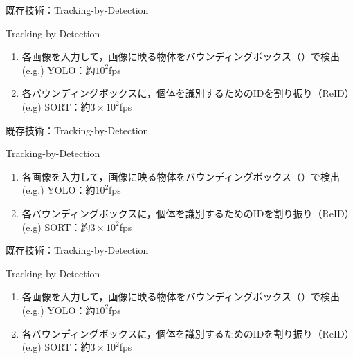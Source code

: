 \begin{frame}{既存技術：Tracking-by-Detection}
    \begin{block}{Tracking-by-Detection}
        \begin{enumerate}
            \item 各画像を入力して，画像に映る物体をバウンディングボックス（\red{$\square$}）で検出
            \\\ra (e.g.) YOLO：約$10^2$fps
            \item 各バウンディングボックスに，個体を識別するためのIDを割り振り（ReID）
            \\\ra (e.g) SORT：約$3\times10^2$fps
        \end{enumerate}        
    \end{block}
\end{frame}
\begin{frame}[noframenumbering]{既存技術：Tracking-by-Detection}
    \begin{block}{Tracking-by-Detection}
        \begin{enumerate}
            \item 各画像を入力して，画像に映る物体をバウンディングボックス（\red{$\square$}）で検出
            \\\ra (e.g.) YOLO：約$10^2$fps
            \item 各バウンディングボックスに，個体を識別するためのIDを割り振り（ReID）
            \\\ra (e.g) SORT：約$3\times10^2$fps
        \end{enumerate}        
    \end{block}
\end{frame}
\begin{frame}[noframenumbering]{既存技術：Tracking-by-Detection}
    \begin{block}{Tracking-by-Detection}
        \begin{enumerate}
            \item 各画像を入力して，画像に映る物体をバウンディングボックス（\red{$\square$}）で検出
            \\\ra (e.g.) YOLO：約$10^2$fps
            \item 各バウンディングボックスに，個体を識別するためのIDを割り振り（ReID）
            \\\ra (e.g) SORT：約$3\times10^2$fps
        \end{enumerate}        
    \end{block}
\end{frame}

